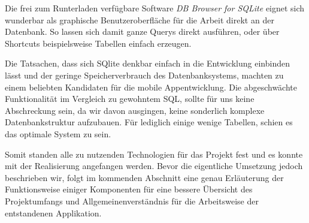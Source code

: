 Die frei zum Runterladen verfügbare Software \textit{DB Browser for SQLite} eignet sich wunderbar als graphische Benutzeroberfläche für die Arbeit direkt an der Datenbank. So lassen sich damit ganze Querys direkt ausführen, oder über Shortcuts beispielsweise Tabellen einfach erzeugen.

Die Tatsachen, dass sich SQlite denkbar einfach in die Entwicklung einbinden lässt und der geringe Speicherverbrauch des Datenbanksystems, machten zu einem beliebten Kandidaten für die mobile Appentwicklung. Die abgeschwächte Funktionalität im Vergleich zu gewohntem SQL, sollte für uns keine Abschreckung sein, da wir davon ausgingen, keine sonderlich komplexe Datenbankstruktur aufzubauen. Für lediglich einige wenige Tabellen, schien es das optimale System zu sein. 

Somit standen alle zu nutzenden Technologien für das Projekt fest und es konnte mit der Realisierung angefangen werden. Bevor die eigentliche Umsetzung jedoch beschrieben wir, folgt im kommenden Abschnitt eine genau Erläuterung der Funktionsweise einiger Komponenten für eine bessere Übersicht des Projektumfangs und Allgemeinenverständnis für die Arbeitsweise der entstandenen Applikation.